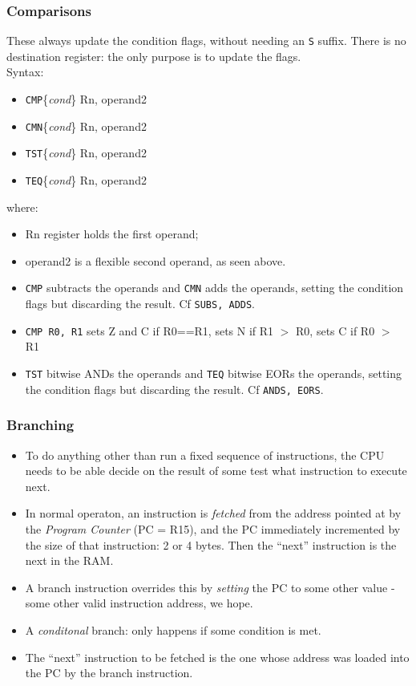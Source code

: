 \documentclass[10pt]{beamer}
\begin{document}
\begin{frame}
\frametitle{Comparisons}
These always update the condition flags, without needing an \texttt{S} suffix. There is no destination register: the only purpose is to update the flags.\\
Syntax:
\begin{itemize}
\item \texttt{CMP}\{\textit{cond}\} Rn, operand2
\item \texttt{CMN}\{\textit{cond}\} Rn, operand2
\item \texttt{TST}\{\textit{cond}\} Rn, operand2
\item \texttt{TEQ}\{\textit{cond}\} Rn, operand2
\end{itemize}

where:
\begin{itemize}
\item Rn register holds the first operand;
\item operand2 is a flexible second operand, as seen above.
\item \texttt{CMP} subtracts the operands and \texttt{CMN} adds the operands, setting the condition flags but discarding the result. Cf \texttt{SUBS, ADDS}.
\item \texttt{CMP R0, R1} sets Z and C if R0==R1, sets N if R1 $>$ R0, sets C if R0 $>$ R1
\item \texttt{TST} bitwise ANDs the operands and \texttt{TEQ} bitwise EORs the operands, setting the condition flags but discarding the result. Cf \texttt{ANDS, EORS}.
\end{itemize}
\end{frame}

\begin{frame}
\frametitle{Branching}
\begin{itemize}
\item To do anything other than run a fixed sequence of instructions, the CPU needs to be able decide on the result of some test what instruction to execute next.
\item In normal operaton, an instruction is \emph{fetched} from the address pointed at by the \emph{Program Counter} (PC = R15), and the PC immediately incremented by the size of that instruction: 2  or 4 bytes. Then the ``next'' instruction is the next in the RAM.
\item A branch instruction overrides this by \emph{setting} the PC to some other value - some other valid instruction address, we hope. 
\item A \emph{conditonal} branch: only happens if some condition is met.
\item The ``next'' instruction to be fetched is the one whose address was loaded into the PC by the branch instruction.
\end{itemize}
\end{frame}
\end{document}
